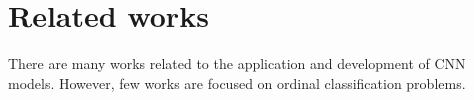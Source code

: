 \documentclass[journal]{IEEEtran}
\begin{document}
%	
%	
	

	
	\section{Related works}
	\label{sect:relatedwork}
	There are many works related to the application and development of CNN models. However, few works are focused on ordinal classification problems.
	
\end{document}
